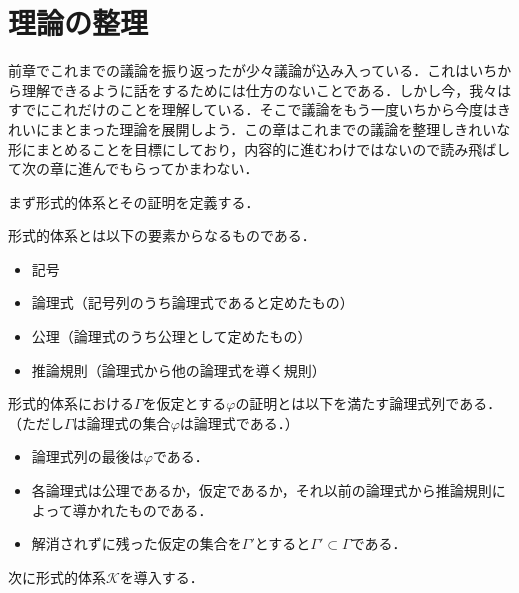 \documentclass[10pt,b5paper,papersize,dvipdfmx]{jsbook}
\newenvironment{TEIRI}[1]{
  \itemize
  \item [\headfont #1]
}{\enditemize}
\begin{document}
\section{理論の整理}
前章でこれまでの議論を振り返ったが少々議論が込み入っている．これはいちから理解できるように話をするためには仕方のないことである．しかし今，我々はすでにこれだけのことを理解している．そこで議論をもう一度いちから今度はきれいにまとまった理論を展開しよう．この章はこれまでの議論を整理しきれいな形にまとめることを目標にしており，内容的に進むわけではないので読み飛ばして次の章に進んでもらってかまわない．\par
まず形式的体系とその証明を定義する．
\begin{TEIRI}{定義}
  形式的体系とは以下の要素からなるものである．
  \begin{itemize}
    \item 記号
    \item 論理式（記号列のうち論理式であると定めたもの）
    \item 公理（論理式のうち公理として定めたもの）
    \item 推論規則（論理式から他の論理式を導く規則）
  \end{itemize}
\end{TEIRI}
\begin{TEIRI}{定義}
  形式的体系における$\Gamma$を仮定とする$\varphi$の証明とは以下を満たす論理式列である．（ただし$\Gamma$は論理式の集合$\varphi$は論理式である．）
  \begin{itemize}
    \item 論理式列の最後は$\varphi$である．
    \item 各論理式は公理であるか，仮定であるか，それ以前の論理式から推論規則によって導かれたものである．
    \item 解消されずに残った仮定の集合を$\Gamma'$とすると$\Gamma'\subset \Gamma$である．
  \end{itemize}
\end{TEIRI}
    次に形式的体系$\mathcal K$を導入する．
\end{document}

